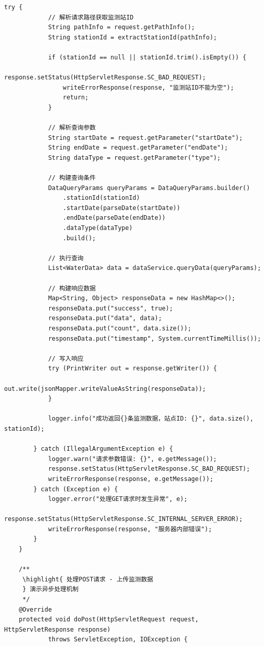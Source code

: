 \begin{lstlisting}[style=java]
        try {
            // 解析请求路径获取监测站ID
            String pathInfo = request.getPathInfo();
            String stationId = extractStationId(pathInfo);
            
            if (stationId == null || stationId.trim().isEmpty()) {
                response.setStatus(HttpServletResponse.SC_BAD_REQUEST);
                writeErrorResponse(response, "监测站ID不能为空");
                return;
            }
            
            // 解析查询参数
            String startDate = request.getParameter("startDate");
            String endDate = request.getParameter("endDate");
            String dataType = request.getParameter("type");
            
            // 构建查询条件
            DataQueryParams queryParams = DataQueryParams.builder()
                .stationId(stationId)
                .startDate(parseDate(startDate))
                .endDate(parseDate(endDate))
                .dataType(dataType)
                .build();
            
            // 执行查询
            List<WaterData> data = dataService.queryData(queryParams);
            
            // 构建响应数据
            Map<String, Object> responseData = new HashMap<>();
            responseData.put("success", true);
            responseData.put("data", data);
            responseData.put("count", data.size());
            responseData.put("timestamp", System.currentTimeMillis());
            
            // 写入响应
            try (PrintWriter out = response.getWriter()) {
                out.write(jsonMapper.writeValueAsString(responseData));
            }
            
            logger.info("成功返回{}条监测数据，站点ID: {}", data.size(), stationId);
            
        } catch (IllegalArgumentException e) {
            logger.warn("请求参数错误: {}", e.getMessage());
            response.setStatus(HttpServletResponse.SC_BAD_REQUEST);
            writeErrorResponse(response, e.getMessage());
        } catch (Exception e) {
            logger.error("处理GET请求时发生异常", e);
            response.setStatus(HttpServletResponse.SC_INTERNAL_SERVER_ERROR);
            writeErrorResponse(response, "服务器内部错误");
        }
    }
    
    /**
     \highlight{ 处理POST请求 - 上传监测数据
     } 演示异步处理机制
     */
    @Override
    protected void doPost(HttpServletRequest request, HttpServletResponse response) 
            throws ServletException, IOException {
        

\end{lstlisting}
